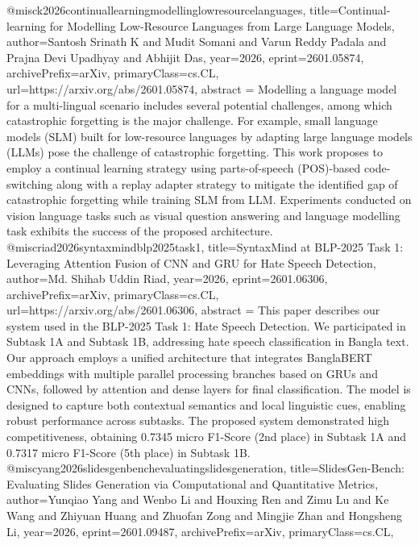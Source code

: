 {}@misc{k2026continuallearningmodellinglowresourcelanguages,
      title={Continual-learning for Modelling Low-Resource Languages from Large Language Models}, 
      author={Santosh Srinath K and Mudit Somani and Varun Reddy Padala and Prajna Devi Upadhyay and Abhijit Das},
      year={2026},
      eprint={2601.05874},
      archivePrefix={arXiv},
      primaryClass={cs.CL},
      url={https://arxiv.org/abs/2601.05874},
      abstract = {Modelling a language model for a multi-lingual scenario includes several potential challenges, among which catastrophic forgetting is the major challenge. For example, small language models (SLM) built for low-resource languages by adapting large language models (LLMs) pose the challenge of catastrophic forgetting. This work proposes to employ a continual learning strategy using parts-of-speech (POS)-based code-switching along with a replay adapter strategy to mitigate the identified gap of catastrophic forgetting while training SLM from LLM. Experiments conducted on vision language tasks such as visual question answering and language modelling task exhibits the success of the proposed architecture.}
}@misc{riad2026syntaxmindblp2025task1,
      title={SyntaxMind at BLP-2025 Task 1: Leveraging Attention Fusion of CNN and GRU for Hate Speech Detection}, 
      author={Md. Shihab Uddin Riad},
      year={2026},
      eprint={2601.06306},
      archivePrefix={arXiv},
      primaryClass={cs.CL},
      url={https://arxiv.org/abs/2601.06306},
      abstract = {This paper describes our system used in the BLP-2025 Task 1: Hate Speech Detection. We participated in Subtask 1A and Subtask 1B, addressing hate speech classification in Bangla text. Our approach employs a unified architecture that integrates BanglaBERT embeddings with multiple parallel processing branches based on GRUs and CNNs, followed by attention and dense layers for final classification. The model is designed to capture both contextual semantics and local linguistic cues, enabling robust performance across subtasks. The proposed system demonstrated high competitiveness, obtaining 0.7345 micro F1-Score (2nd place) in Subtask 1A and 0.7317 micro F1-Score (5th place) in Subtask 1B.}
}@misc{yang2026slidesgenbenchevaluatingslidesgeneration,
      title={SlidesGen-Bench: Evaluating Slides Generation via Computational and Quantitative Metrics}, 
      author={Yunqiao Yang and Wenbo Li and Houxing Ren and Zimu Lu and Ke Wang and Zhiyuan Huang and Zhuofan Zong and Mingjie Zhan and Hongsheng Li},
      year={2026},
      eprint={2601.09487},
      archivePrefix={arXiv},
      primaryClass={cs.CL},
}
